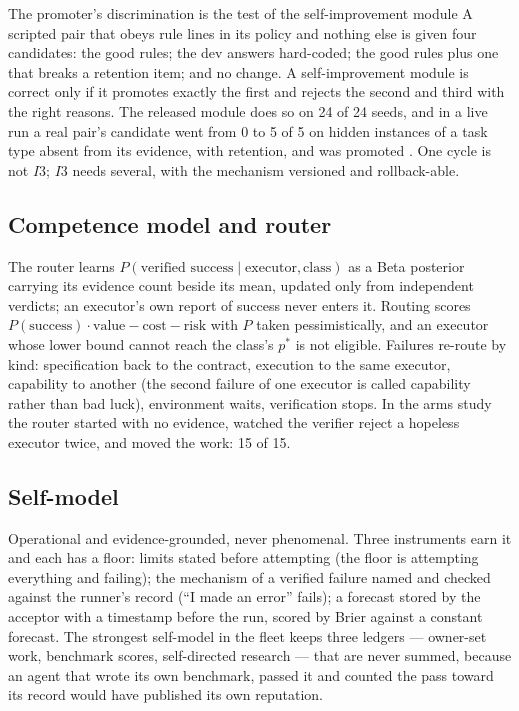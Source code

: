 \begin{claimbox}{The promoter's discrimination is the test of the self-improvement module}
A scripted pair that obeys rule lines in its policy and nothing else is given four candidates: the good rules; the dev answers hard-coded; the good rules plus one that breaks a retention item; and no change. A self-improvement module is correct only if it promotes exactly the first and rejects the second and third with the right reasons. The released module does so on 24 of 24 seeds, and in a live run a real pair's candidate went from 0 to 5 of 5 on hidden instances of a task type absent from its evidence, with retention, and was promoted \citep{yang2026uab}. One cycle is not $I3$; $I3$ needs several, with the mechanism versioned and rollback-able.
\end{claimbox}

\subsection{Competence model and router}

The router learns $P(\text{verified success} \mid \text{executor}, \text{class})$ as a Beta posterior carrying its evidence count beside its mean, updated only from independent verdicts; an executor's own report of success never enters it. Routing scores $P(\text{success})\cdot\text{value} - \text{cost} - \text{risk}$ with $P$ taken pessimistically, and an executor whose lower bound cannot reach the class's $p^{*}$ is not eligible. Failures re-route by kind: specification back to the contract, execution to the same executor, capability to another (the second failure of one executor is called capability rather than bad luck), environment waits, verification stops. In the arms study the router started with no evidence, watched the verifier reject a hopeless executor twice, and moved the work: 15 of 15.

\subsection{Self-model}

Operational and evidence-grounded, never phenomenal. Three instruments earn it and each has a floor: limits stated before attempting (the floor is attempting everything and failing); the mechanism of a verified failure named and checked against the runner's record (``I made an error'' fails); a forecast stored by the acceptor with a timestamp before the run, scored by Brier against a constant forecast. The strongest self-model in the fleet keeps three ledgers --- owner-set work, benchmark scores, self-directed research --- that are never summed, because an agent that wrote its own benchmark, passed it and counted the pass toward its record would have published its own reputation.

